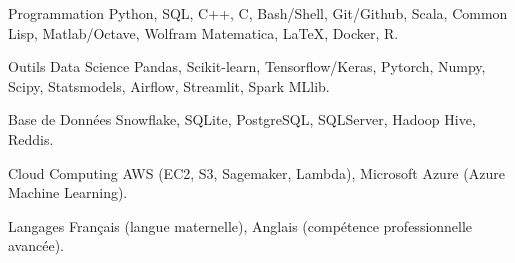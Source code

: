 

\begin{cvskills}

  \cvskill
    {Programmation} %
    {Python, SQL, C++, C, Bash/Shell, Git/Github, Scala, Common Lisp, Matlab/Octave, Wolfram Matematica, \LaTeX, Docker, R.} %

  \cvskill
    {Outils Data Science} %
    {Pandas, Scikit-learn, Tensorflow/Keras, Pytorch, Numpy, Scipy, Statsmodels, Airflow, Streamlit, Spark MLlib.} %

  \cvskill
    {Base de Données} %
    {Snowflake, SQLite, PostgreSQL, SQLServer, Hadoop Hive, Reddis.} %

  \cvskill
    {Cloud Computing} %
    {AWS (EC2, S3, Sagemaker, Lambda), Microsoft Azure (Azure Machine Learning).} %

  \cvskill
    {Langages} %
    {Français (langue maternelle), Anglais (compétence professionnelle avancée).} %

\end{cvskills}
